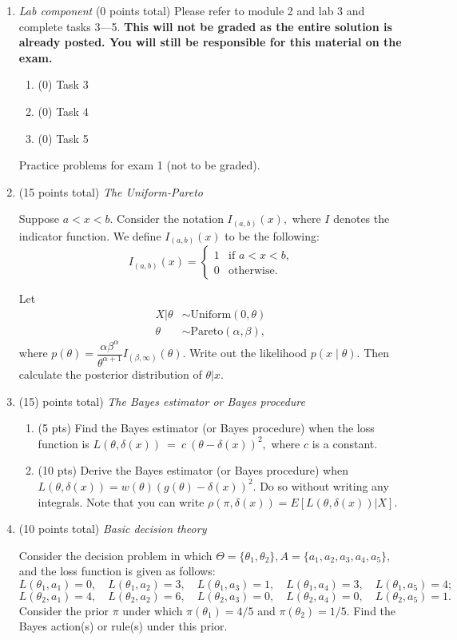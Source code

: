 \documentclass{article}
\begin{document}
\begin{enumerate}
\item {\em Lab component} 
  (0 points total) Please refer to module 2 and lab 3 and complete tasks 3---5. \textbf{This will not be graded as the entire solution is already posted. You will still be responsible for this material on the exam.}
  \begin{enumerate}
  \item (0) Task 3
  \item (0) Task 4
  \item (0) Task 5
  \end{enumerate}
  
  \newpage
  
Practice problems for exam 1 (not to be graded).   
  
\item (15 points total) {\em The Uniform-Pareto}

Suppose $a < x < b.$ Consider the notation
$I_{(a,b)}(x),$ where $I$ denotes the indicator function. We define $I_{(a,b)}(x)$ to be the following:
$$
I_{(a,b)}(x)=
\begin{cases} 
1 & \text{if $a < x < b$,}
\\
0 &\text{otherwise.}
\end{cases}
$$

Let 
\begin{align*}
X|\theta &\sim \text{Uniform}(0,\theta)\\
\theta &\sim \text{Pareto}(\alpha,\beta),
\end{align*}
where $p(\theta) = \dfrac{\alpha \beta^\alpha}{\theta^{\alpha +1}}I_{(\beta,\infty)}(\theta).$
Write out the likelihood $p(x\mid \theta).$ Then calculate the posterior distribution of $\theta|x.$  
  
  
\item (15)  points total) {\em The Bayes estimator or Bayes procedure}
\begin{enumerate}
\item (5 pts) Find the Bayes estimator (or Bayes procedure) when the loss function is  $L(\theta, \delta(x))~=~c~(\theta-\delta(x))^2,$ where $c$ is a constant. 
\item (10 pts) Derive the Bayes estimator (or Bayes procedure) when $L(\theta, \delta(x)) = w(\theta) (g(\theta)-\delta(x))^2.$ Do so without writing any integrals. Note that you can write $\rho(\pi,\delta(x)) =  E[L(\theta,\delta(x))|X].$ 
\end{enumerate}

\item  (10 points total) {\em Basic decision theory}

Consider the decision problem in which $\Theta = \{ \theta_1, \theta_2\}, 
A = \{a_1, a_2, a_3, a_4, a_5\}$, and the loss function is given as follows: 
$$L(\theta_1, a_1) = 0,\quad L(\theta_1, a_2) = 3,\quad L(\theta_1, a_3) = 1,\quad L(\theta_1, a_4) = 3,\quad
L(\theta_1, a_5) = 4;$$ 
$$L(\theta_2, a_1) = 4,\quad L(\theta_2, a_2) = 6,\quad L(\theta_2, a_3) = 0,\quad L(\theta_2, a_4) = 0,\quad
L(\theta_2, a_5) = 1.$$
Consider the prior $\pi$ under which $\pi(\theta_1) = 4/5$ and $\pi(\theta_2) = 1/5.$ Find the Bayes action(s) or rule(s) under this prior. 


    \end{enumerate}
\end{document}
